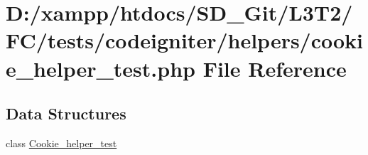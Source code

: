 \hypertarget{cookie__helper__test_8php}{}\section{D\+:/xampp/htdocs/\+S\+D\+\_\+\+Git/\+L3\+T2/\+F\+C/tests/codeigniter/helpers/cookie\+\_\+helper\+\_\+test.php File Reference}
\label{cookie__helper__test_8php}
\subsection*{Data Structures}
\begin{DoxyCompactItemize}
\item 
class \hyperlink{class_cookie__helper__test}{Cookie\+\_\+helper\+\_\+test}
\end{DoxyCompactItemize}
